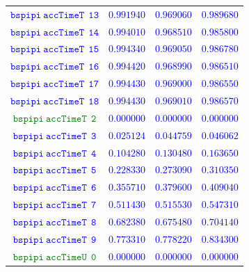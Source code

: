 \documentclass[10pt,a4paper]{article}
\begin{document}
\begin{table}[h!]
{\begin{tabular}{cccc}
\textcolor{blue}{$\mathtt{bspipi~accTimeT~~13}$} & \textcolor{blue}{$0.991940$}& \textcolor{blue}{$0.969060$}& \textcolor{blue}{$0.989680$}\\
\textcolor{blue}{$\mathtt{bspipi~accTimeT~~14}$} & \textcolor{blue}{$0.994010$}& \textcolor{blue}{$0.968510$}& \textcolor{blue}{$0.985800$}\\
\textcolor{blue}{$\mathtt{bspipi~accTimeT~~15}$} & \textcolor{blue}{$0.994340$}& \textcolor{blue}{$0.969050$}& \textcolor{blue}{$0.986780$}\\
\textcolor{blue}{$\mathtt{bspipi~accTimeT~~16}$} & \textcolor{blue}{$0.994420$}& \textcolor{blue}{$0.968990$}& \textcolor{blue}{$0.986510$}\\
\textcolor{blue}{$\mathtt{bspipi~accTimeT~~17}$} & \textcolor{blue}{$0.994430$}& \textcolor{blue}{$0.969000$}& \textcolor{blue}{$0.986550$}\\
\textcolor{blue}{$\mathtt{bspipi~accTimeT~~18}$} & \textcolor{blue}{$0.994430$}& \textcolor{blue}{$0.969010$}& \textcolor{blue}{$0.986570$}\\
\textcolor{Green}{$\mathtt{bspipi~accTimeT~~2}$} & \textcolor{blue}{$0.000000$}& \textcolor{blue}{$0.000000$}& \textcolor{blue}{$0.000000$}\\
\textcolor{blue}{$\mathtt{bspipi~accTimeT~~3}$} & \textcolor{blue}{$0.025124$}& \textcolor{blue}{$0.044759$}& \textcolor{blue}{$0.046062$}\\
\textcolor{blue}{$\mathtt{bspipi~accTimeT~~4}$} & \textcolor{blue}{$0.104280$}& \textcolor{blue}{$0.130480$}& \textcolor{blue}{$0.163650$}\\
\textcolor{blue}{$\mathtt{bspipi~accTimeT~~5}$} & \textcolor{blue}{$0.228330$}& \textcolor{blue}{$0.273090$}& \textcolor{blue}{$0.310350$}\\
\textcolor{blue}{$\mathtt{bspipi~accTimeT~~6}$} & \textcolor{blue}{$0.355710$}& \textcolor{blue}{$0.379600$}& \textcolor{blue}{$0.409040$}\\
\textcolor{blue}{$\mathtt{bspipi~accTimeT~~7}$} & \textcolor{blue}{$0.511430$}& \textcolor{blue}{$0.515530$}& \textcolor{blue}{$0.547310$}\\
\textcolor{blue}{$\mathtt{bspipi~accTimeT~~8}$} & \textcolor{blue}{$0.682380$}& \textcolor{blue}{$0.675480$}& \textcolor{blue}{$0.704140$}\\
\textcolor{blue}{$\mathtt{bspipi~accTimeT~~9}$} & \textcolor{blue}{$0.773310$}& \textcolor{blue}{$0.778220$}& \textcolor{blue}{$0.834300$}\\
\textcolor{Green}{$\mathtt{bspipi~accTimeU~~0}$} & \textcolor{blue}{$0.000000$}& \textcolor{blue}{$0.000000$}& \textcolor{blue}{$0.000000$}\\

\end{tabular}}
\end{table}
\end{document}
